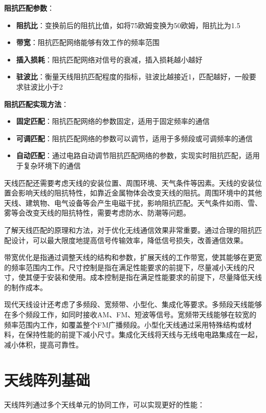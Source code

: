 \documentclass[12pt,UTF8]{ctexbook}
\begin{document}
\textbf{阻抗匹配参数}：
\begin{itemize}[leftmargin=3.5em]
    \item \textbf{阻抗比}：变换前后的阻抗比值，如将75欧姆变换为50欧姆，阻抗比为1.5
    \item \textbf{带宽}：阻抗匹配网络能够有效工作的频率范围
    \item \textbf{插入损耗}：阻抗匹配网络对信号的衰减，插入损耗越小越好
    \item \textbf{驻波比}：衡量天线阻抗匹配程度的指标，驻波比越接近1，匹配越好，一般要求驻波比小于2
\end{itemize}

\textbf{阻抗匹配实现方法}：
\begin{itemize}[leftmargin=3.5em]
    \item \textbf{固定匹配}：阻抗匹配网络的参数固定，适用于固定频率的通信
    \item \textbf{可调匹配}：阻抗匹配网络的参数可以调节，适用于多频段或可调频率的通信
    \item \textbf{自动匹配}：通过电路自动调节阻抗匹配网络的参数，实现实时阻抗匹配，适用于复杂环境下的通信
\end{itemize}

天线匹配还需要考虑天线的安装位置、周围环境、天气条件等因素。天线的安装位置会影响天线的阻抗特性，如靠近金属物体会改变天线的阻抗。周围环境中的其他天线、建筑物、电气设备等会产生电磁干扰，影响阻抗匹配。天气条件如雨、雪、雾等会改变天线的阻抗特性，需要考虑防水、防潮等问题。

了解天线匹配的原理和方法，对于优化无线通信效果非常重要。通过合理的阻抗匹配设计，可以最大限度地提高信号传输效率，降低信号损失，改善通信效果。

带宽优化是指通过调整天线的结构和参数，扩展天线的工作带宽，使其能够在更宽的频率范围内工作。尺寸控制是指在满足性能要求的前提下，尽量减小天线的尺寸，使其便于安装和使用。成本控制是指在满足性能要求的前提下，尽量降低天线的制作成本。

现代天线设计还考虑了多频段、宽频带、小型化、集成化等要求。多频段天线能够在多个频段工作，如同时接收AM、FM、短波等信号。宽频带天线能够在较宽的频率范围内工作，如覆盖整个FM广播频段。小型化天线通过采用特殊结构或材料，在保持性能的前提下减小尺寸。集成化天线将天线与无线电电路集成在一起，减小体积，提高可靠性。

\section{天线阵列基础}

天线阵列通过多个天线单元的协同工作，可以实现更好的性能：
\end{document}
